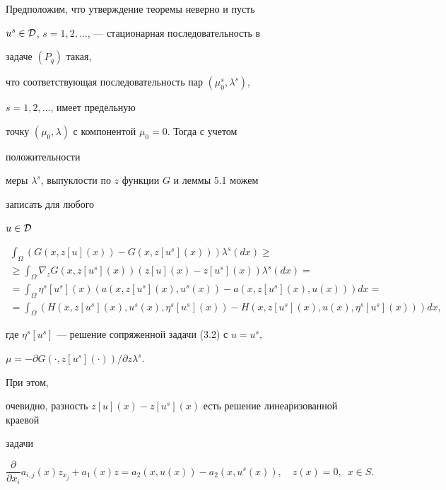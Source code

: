 \begin{pf} 


Предположим, что утверждение теоремы неверно и пусть 


$u^s\in\cal D$, $s=1,2,\dotsc$, --- стационарная последовательность в 


задаче $(P_q)$ такая, 


что соответствующая последовательность пар $(\mu^s_0,\lambda^s)$, 


$s=1,2,\dotsc$, имеет предельную 


точку $(\mu_0,\lambda)$ с компонентой $\mu_0=0$. Тогда с учетом 


положительности 


меры $\lambda^s$, выпуклости по $z$ функции $G$ и леммы 5.1 можем 


записать для любого 


$u\in\cal D$ 


\begin{multline} 


\int_\Omega(G(x,z[u](x))-G(x,z[u^s](x)))\lambda^s(dx)\ge \\ 


\ge\int_\Omega\nabla_z G(x,z[u^s](x))(z[u](x)- 


z[u^s](x))\lambda^s(dx)=\\ 


=\int_\Omega \eta^s[u^s](x)(a(x,z[u^s](x),u^s(x))- 


a(x,z[u^s](x),u(x)))dx= \\ 


=\int_\Omega(H(x,z[u^s](x),u^s(x),\eta^s[u^s](x))- 


H(x,z[u^s](x),u(x),\eta^s[u^s](x)))dx, 


\end{multline} 


где $\eta^s[u^s]$ --- решение сопряженной задачи (3.2) с $u=u^s$, 


$\mu=-\partial G(\cdot,z[u^s](\cdot))/\partial z\lambda^s$.


При этом, 


очевидно, разность $z[u](x)-z[u^s](x)$ есть решение линеаризованной краевой 


задачи 


$$ 


\frac{\partial}{\partial x_i}a_{i,j}(x)z_{x_j}+a_1(x)z= 


a_2(x,u(x))-a_2(x,u^s(x)),\quad 


z(x)=0,\ \; x\in S. 


$$ 



\end{pf}
